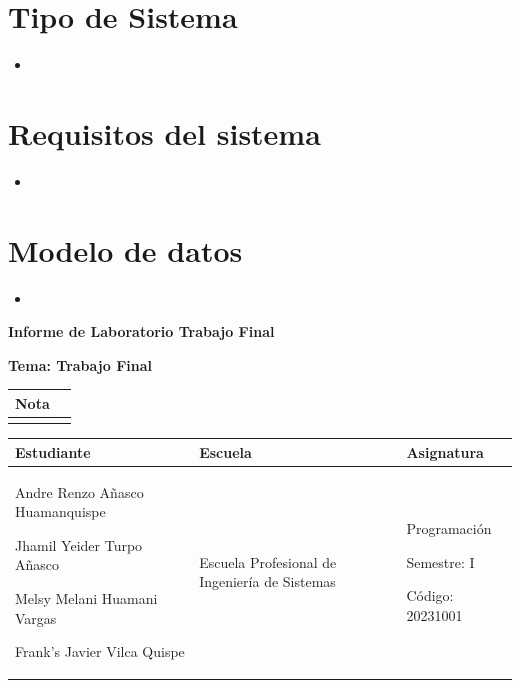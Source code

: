 \documentclass{article}
\newcommand{\itemStudent}{Andre Renzo Añasco Huamanquispe}
\newcommand{\itemStudentc}{Frank's Javier Vilca Quispe }
\newcommand{\itemStudenta}{Jhamil Yeider Turpo Añasco}
\newcommand{\itemStudentb}{Melsy Melani Huamani Vargas}
\newcommand{\itemCourse}{Programación}
\newcommand{\itemCourseCode}{20231001}
\newcommand{\itemSemester}{I}
\newcommand{\itemSchool}{Escuela Profesional de Ingeniería de Sistemas}
\newcommand{\itemPracticeNumber}{Trabajo Final}
\newcommand{\itemTheme}{Trabajo Final}
\begin{document}
	
	\vspace*{10px}
	
	\section{Tipo de Sistema}
		\begin{itemize}		
			\item 
		\end{itemize}
			
	\section{Requisitos del sistema}
		\begin{itemize}
			\item 
		\end{itemize}
		
	\section{Modelo de datos}
		\begin{itemize}
			\item 
		\end{itemize}
	\begin{center}	
		\fontsize{17}{17} \textbf{ Informe de Laboratorio \itemPracticeNumber}
	\end{center}
	\centerline{\textbf{\Large Tema: \itemTheme}}

	\begin{flushright}
		\begin{tabular}{|M{2.5cm}|N|}
			\hline 
			\color{white} \textbf{Nota}  \\
			\hline 
			     \\[30pt]
			\hline 			
		\end{tabular}
	\end{flushright}	

	\begin{table}[H]
		\begin{tabular}{|x{4.7cm}|x{4.8cm}|x{4.8cm}|}
			\hline 
			\color{white} \textbf{Estudiante} & \color{white}\textbf{Escuela}  & \color{white}\textbf{Asignatura}   \\
			\hline 
			{\itemStudent \par \itemStudenta \par \itemStudentb \par \itemStudentc} & \itemSchool & {\itemCourse \par Semestre: \itemSemester \par Código: \itemCourseCode}     \\
			\hline 			
		\end{tabular}
	\end{table}		
	
\end{document}

